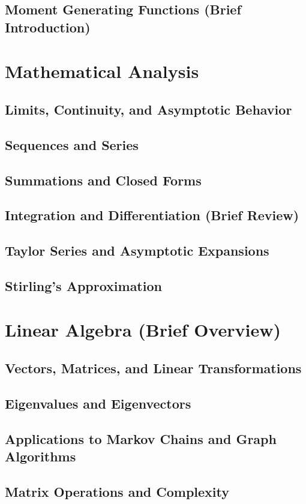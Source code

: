 \subsection{Moment Generating Functions (Brief Introduction)}

\section{Mathematical Analysis}
\subsection{Limits, Continuity, and Asymptotic Behavior}
\subsection{Sequences and Series}
\subsection{Summations and Closed Forms}
\subsection{Integration and Differentiation (Brief Review)}
\subsection{Taylor Series and Asymptotic Expansions}
\subsection{Stirling's Approximation}

\section{Linear Algebra (Brief Overview)}
\subsection{Vectors, Matrices, and Linear Transformations}
\subsection{Eigenvalues and Eigenvectors}
\subsection{Applications to Markov Chains and Graph Algorithms}
\subsection{Matrix Operations and Complexity}

